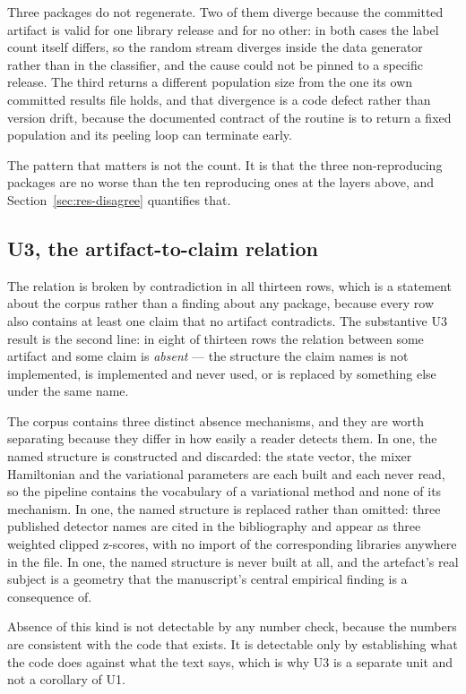 \documentclass[sigconf,review]{acmart}
\begin{document}
Three packages do not regenerate. Two of them diverge because the committed
artifact is valid for one library release and for no other: in both cases the
label count itself differs, so the random stream diverges inside the data
generator rather than in the classifier, and the cause could not be pinned to
a specific release. The third returns a different population size from the one
its own committed results file holds, and that divergence is a code defect
rather than version drift, because the documented contract of the routine is to
return a fixed population and its peeling loop can terminate early.

The pattern that matters is not the count. It is that the three
non-reproducing packages are no worse than the ten reproducing ones at the
layers above, and Section~\ref{sec:res-disagree} quantifies that.

\subsection{U3, the artifact-to-claim relation}
\label{sec:res-relation}

The relation is broken by contradiction in all thirteen rows, which is a
statement about the corpus rather than a finding about any package, because
every row also contains at least one claim that no artifact contradicts. The
substantive U3 result is the second line: in eight of thirteen rows the
relation between some artifact and some claim is \emph{absent} --- the
structure the claim names is not implemented, is implemented and never used,
or is replaced by something else under the same name.

The corpus contains three distinct absence mechanisms, and they are worth
separating because they differ in how easily a reader detects them. In one,
the named structure is constructed and discarded: the state vector, the mixer
Hamiltonian and the variational parameters are each built and each never read,
so the pipeline contains the vocabulary of a variational method and none of its
mechanism. In one, the named structure is replaced rather than omitted: three
published detector names are cited in the bibliography and appear as three
weighted clipped z-scores, with no import of the corresponding libraries
anywhere in the file. In one, the named structure is never built at all, and
the artefact's real subject is a geometry that the manuscript's central
empirical finding is a consequence of.

Absence of this kind is not detectable by any number check, because the
numbers are consistent with the code that exists. It is detectable only by
establishing what the code does against what the text says, which is why U3
is a separate unit and not a corollary of U1.
\end{document}
